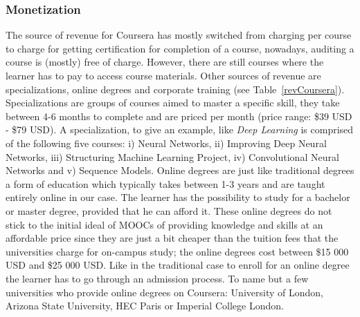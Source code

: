 \documentclass[11]{article}
\begin{document}
   	\subsubsection{Monetization\\}
	The source of revenue for Coursera has mostly switched from charging per course to charge for getting certification for completion of a course, nowadays, auditing a course is (mostly) free of charge. However, there are still courses where the learner has to pay to access course materials. Other sources of revenue are specializations, online degrees and corporate training (see Table~\ref{revCoursera}). Specializations are groups of courses aimed to master a specific skill, they take between 4-6 months to complete and are priced per month (price range: \$39 USD - \$79 USD). A specialization, to give an example, like \textit{Deep Learning} is comprised of the following five courses: i) Neural Networks, ii) Improving Deep Neural Networks, iii) Structuring Machine Learning Project, iv) Convolutional Neural Networks and v) Sequence Models. Online degrees are just like traditional degrees a form of education which typically takes between 1-3 years and are taught entirely online in our case. The learner has the possibility to study for a bachelor or master degree, provided that he can afford it. These online degrees do not stick to the initial ideal of MOOCs of providing knowledge and skills at an affordable price since they are just a bit cheaper than the tuition fees that the universities charge for on-campus study; the online degrees cost between \$15 000 USD and \$25 000 USD. Like in the traditional case to enroll for an online degree the learner has to go through an admission process. To name but a few universities who provide online degrees on Coursera: University of London, Arizona State University, HEC Paris or Imperial College London. \\
\end{document}
